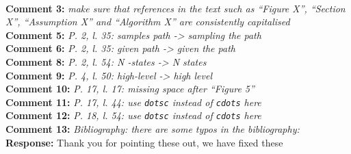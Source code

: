 \documentclass[11pt]{article}
\newcommand{\rev}[2]{\textbf{Comment #1: }\emph{#2}}
\newcommand{\resp}{\textbf{Response: }}
\begin{document}
~\\
\rev{3}{make sure that references in the text such as “Figure X”, “Section X”, “Assumption X” and “Algorithm X” are consistently capitalised} \\
\rev{5}{P. 2, l. 35: samples path -> sampling the path} ~\\
\rev{6}{P. 2, l. 35: given path -> given the path} ~\\
\rev{8}{P. 2, l. 54: N -states -> N states}
~\\
\rev{9}{P. 4, l. 50: high-level -> high level}
~\\
\rev{10}{P. 17, l. 17: missing space after “Figure 5”}
~\\
\rev{11}{P. 17, l. 44: use \texttt{dotsc} instead of \texttt{cdots} here}
~\\
\rev{12}{P. 18, l. 54: use \texttt{dotsc} instead of \texttt{cdots} here}
~\\
\rev{13}{Bibliography: there are some typos in the bibliography:}\\ 
\resp{Thank you for pointing these out, we have fixed these}
\end{document}
